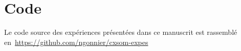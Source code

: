 \documentclass[11pt]{thesul-cs}
\begin{document}
\setcounter{tocdepth}{1}
\tableofcontents

\mainmatter









\nocite{gonnier2020}
\nocite{Gonnier2021InputPU}

\printbibliography[keyword=mypublis, title={Publications}]
\section*{Code}
Le code source des expériences présentées dans ce manuscrit est rassemblé en~\url{https://github.com/ngonnier/cxsom-expes}

\printbibliography[title={Bibliographie}]
\end{document}
